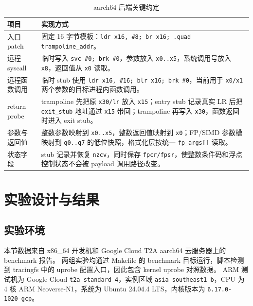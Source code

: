 \documentclass[UTF8,a4paper,11pt,fontset=fandol]{ctexart}
\newcommand{\code}[1]{\texttt{#1}}
\begin{document}
\begin{table}[H]
\centering
\caption{aarch64 后端关键约定}
\label{tab:aarch64-backend}
\begin{tabularx}{\textwidth}{P{3.6cm}Y}
\toprule
\textbf{项目} & \textbf{实现方式}\\
\midrule
入口 patch & 固定 16 字节模板：\code{ldr x16, \#8; br x16; .quad trampoline\_addr}。\\
远程 syscall & 临时写入 \code{svc \#0; brk \#0}，参数放入 \code{x0..x5}，系统调用号放入 \code{x8}，返回值从 \code{x0} 读取。\\
远程函数调用 & 临时 stub 使用 \code{ldr x16, \#16; blr x16; brk \#0}，当前用于 \code{x0/x1} 两个参数的目标进程内函数调用。\\
return probe & trampoline 先把原 \code{x30/lr} 放入 \code{x15}；entry stub 记录真实 LR 后把 \code{exit\_stub} 地址通过 \code{x15} 带回；trampoline 再写入 \code{x30}，函数返回时进入 exit stub。\\
参数与返回值 & 整数参数映射到 \code{x0..x5}，整数返回值映射到 \code{x0}；FP/SIMD 参数槽映射到 \code{q0..q7} 的低位快照，格式化层按统一 \code{fp\_args[]} 读取。\\
状态字段 & stub 记录并恢复 \code{nzcv}，同时保存 \code{fpcr/fpsr}，使整数条件码和浮点控制状态不会被 payload 调用路径改变。\\
\bottomrule
\end{tabularx}
\end{table}

\section{实验设计与结果}

\subsection{实验环境}

本节数据来自 x86\_64 开发机和 Google Cloud T2A aarch64 云服务器上的 benchmark 报告。
两组实验均通过 Makefile 的 benchmark 目标运行，脚本检测到 tracingfs 中的 uprobe 配置入口，因此包含 kernel uprobe 对照数据。
ARM 测试机为 Google Cloud \code{t2a-standard-4}，实例区域 \code{asia-southeast1-b}，CPU 为 4 核 ARM Neoverse-N1，系统为 Ubuntu 24.04.4 LTS，内核版本为 \code{6.17.0-1020-gcp}。
\end{document}
